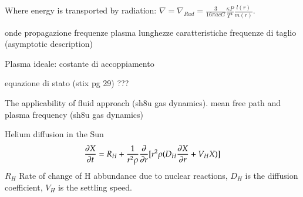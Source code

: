 \documentclass[../main.tex]{subfiles}
\begin{document}
\begin{itemize*}
\item Where energy is transported by radiation: $\nabla=\nabla_{Rad}=\frac{3}{16\pi acG}\frac{\kappa P}{T^4}\frac{l(r)}{m(r)}$.
\item onde propagazione frequenze plasma lunghezze caratteristiche frequenze di taglio (asymptotic description)
\item Plasma ideale: costante di accoppiamento
\item equazione di stato (stix pg 29) ???
\item The applicability of fluid approach (sh8u gas dynamics). mean free path and plasma frequency (sh8u gas dynamics)
\item Helium diffusion in the Sun
\begin{equation*}
    \PDy{t}{X}=R_H+\frac{1}{r^2\rho}\PDof{r}[r^2\rho(D_H\PDy{r}{X}+V_HX)]
\end{equation*}
$R_H$ Rate of change of H abbundance due to nuclear reactions, $D_H$ is the diffusion coefficient, $V_H$ is the settling speed.

\end{itemize*}

\stopcontents[chapters]
\end{document}
